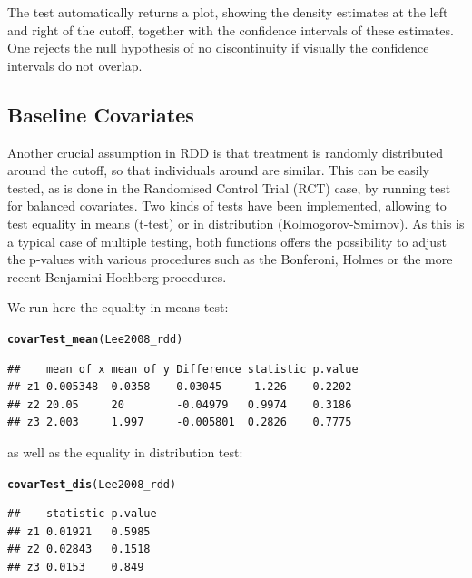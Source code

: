 \documentclass[english,nojss]{jss}\usepackage{graphicx, color}
\makeatletter
\newcommand{\hlfunctioncall}[1]{\textcolor[rgb]{0.501960784313725,0,0.329411764705882}{\textbf{#1}}}%
\newenvironment{kframe}{%
 \def\at@end@of@kframe{}%
 \ifinner\ifhmode%
  \def\at@end@of@kframe{\end{minipage}}%
  \begin{minipage}{\columnwidth}%
 \fi\fi%
 \def\FrameCommand##1{\hskip\@totalleftmargin \hskip-\fboxsep
 \colorbox{shadecolor}{##1}\hskip-\fboxsep
     \hskip-\linewidth \hskip-\@totalleftmargin \hskip\columnwidth}%
 \MakeFramed {\advance\hsize-\width
   \@totalleftmargin\z@ \linewidth\hsize
   \@setminipage}}%
 {\par\unskip\endMakeFramed%
 \at@end@of@kframe}
\newenvironment{knitrout}{}{} %
\makeatother
\begin{document}
The test automatically returns a plot, showing the density estimates
at the left and right of the cutoff, together with the confidence
intervals of these estimates. One rejects the null hypothesis of no
discontinuity if visually the confidence intervals do not overlap. 


\subsection{Baseline Covariates}

Another crucial assumption in RDD is that treatment is randomly distributed
around the cutoff, so that individuals around are similar. This can
be easily tested, as is done in the Randomised Control Trial (RCT)
case, by running test for balanced covariates. Two kinds of tests
have been implemented, allowing to test equality in means (t-test)
or in distribution (Kolmogorov-Smirnov). As this is a typical case
of multiple testing, both functions offers the possibility to adjust
the p-values with various procedures such as the Bonferoni, Holmes
or the more recent Benjamini-Hochberg procedures. 

We run here the equality in means test:

\begin{knitrout}
\color{fgcolor}\begin{kframe}
\begin{alltt}
\hlfunctioncall{covarTest_mean}(Lee2008_rdd)
\end{alltt}
\begin{verbatim}
##    mean of x mean of y Difference statistic p.value
## z1 0.005348  0.0358    0.03045    -1.226    0.2202 
## z2 20.05     20        -0.04979   0.9974    0.3186 
## z3 2.003     1.997     -0.005801  0.2826    0.7775
\end{verbatim}
\end{kframe}
\end{knitrout}


as well as the equality in distribution test:

\begin{knitrout}
\color{fgcolor}\begin{kframe}
\begin{alltt}
\hlfunctioncall{covarTest_dis}(Lee2008_rdd)
\end{alltt}


{\ttfamily\noindent\color{warningcolor}{\#\# Warning: p-values will be approximate in the presence of ties}}\begin{verbatim}
##    statistic p.value
## z1 0.01921   0.5985 
## z2 0.02843   0.1518 
## z3 0.0153    0.849
\end{verbatim}
\end{kframe}
\end{knitrout}
\end{document}

